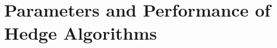 \documentclass{article}
\begin{document}
\section{Parameters and Performance of Hedge Algorithms}




\end{document}

